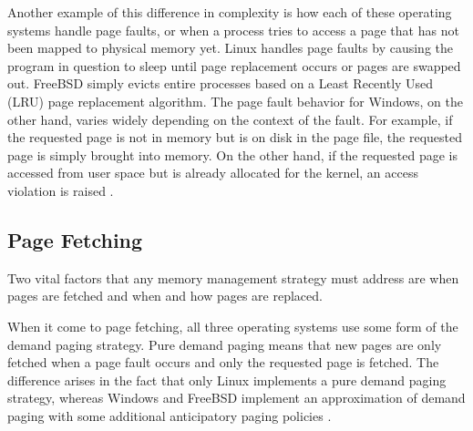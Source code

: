 \documentclass[onecolumn, draftclsnofoot,10pt, compsoc]{IEEEtran}
\begin{document}
Another example of this difference in complexity is how each of these operating systems handle page faults, or when a process tries to access a page that has not been mapped to physical memory yet. Linux handles page faults by causing the program in question to sleep until page replacement occurs or pages are swapped out. FreeBSD simply evicts entire processes based on a Least Recently Used (LRU) page replacement algorithm. The page fault behavior for Windows, on the other hand, varies widely depending on the context of the fault. For example, if the requested page is not in memory but is on disk in the page file, the requested page is simply brought into memory. On the other hand, if the requested page is accessed from user space but is already allocated for the kernel, an access violation is raised \cite{WindowsInternals2}. 

\subsection{Page Fetching}
Two vital factors that any memory management strategy must address are when pages are fetched and when and how pages are replaced. 

When it come to page fetching, all three operating systems use some form of the demand paging strategy. Pure demand paging means that new pages are only fetched when a page fault occurs and only the requested page is fetched. The difference arises in the fact that only Linux implements a pure demand paging strategy, whereas Windows and FreeBSD implement an approximation of demand paging with some additional anticipatory paging policies \cite{Comparison1}.
\end{document}
